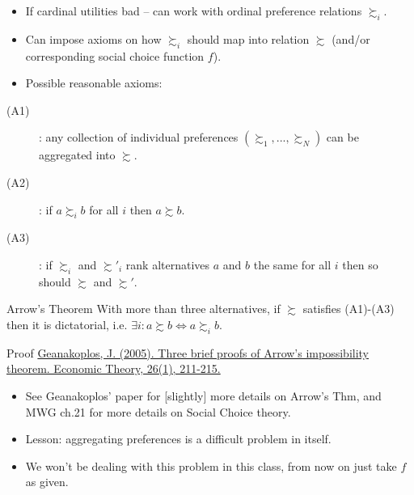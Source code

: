 \documentclass[english,handout]{beamer}		%
\def\lyxframeend{} %
\begin{document}
\begin{itemize}
	\item If cardinal utilities bad -- can work with ordinal preference relations $\succsim_i$.
	\item Can impose axioms on how  $\succsim_i$ should map into  relation $\succsim$ (and/or corresponding social choice function $f$).
	\pause
	\item Possible reasonable axioms:
\end{itemize}
\begin{description}
	\item[(A1)] : any collection of individual preferences $\left(\succsim_1, ..., \succsim_N \right)$ can be aggregated into $\succsim$.
	\item[(A2)] : if $a \succsim_i b$ for all $i$ then $a \succsim b$.
	\item[(A3)] : if $\succsim_i$ and $\succsim'_i$ rank alternatives $a$ and $b$ the same for all $i$ then so should $\succsim$ and $\succsim'$.
\end{description}
\lyxframeend


\begin{block}{Arrow's Theorem}
	With more than three alternatives, if $\succsim$ satisfies (A1)-(A3) then it is dictatorial, i.e. $\exists i: a \succsim b \Leftrightarrow a \succsim_i b$.
\end{block}
\begin{block}{Proof}
	\pause \href{https://link.springer.com/article/10.1007/s00199-004-0556-7}{Geanakoplos, J. (2005). Three brief proofs of Arrow's impossibility theorem. Economic Theory, 26(1), 211-215.}
	\vspace{9em}
\end{block}
\vspace{-2em}
\lyxframeend


\begin{itemize}
	\item See Geanakoplos' paper for [slightly] more details on Arrow's Thm, and MWG ch.21 for more details on Social Choice theory.
	\item Lesson: aggregating preferences is a difficult problem in itself.
	\item We won't be dealing with this problem in this class, from now on just take $f$ as given.
\end{itemize}
\lyxframeend
\end{document}
